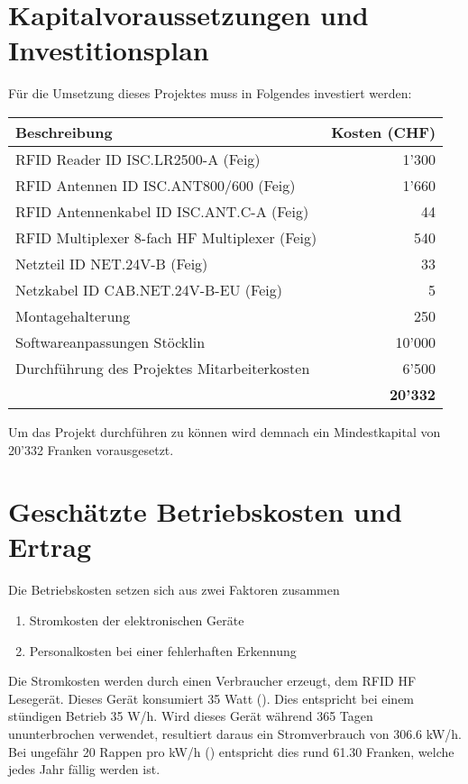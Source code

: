 \chapter{Kapitalvoraussetzungen und Investitionsplan}
Für die Umsetzung dieses Projektes muss in Folgendes investiert werden:

\vspace{1em}

\begin{tabularx}{\textwidth}{|X|r|}
	\hline
	\textbf{Beschreibung} & \textbf{Kosten (CHF)} \\
	\hline
	RFID Reader ID ISC.LR2500-A (Feig) & 1'300 \\
	\hline
	RFID Antennen ID ISC.ANT800/600 (Feig) & 1'660 \\
	\hline
	RFID Antennenkabel ID ISC.ANT.C-A (Feig) & 44 \\
	\hline
	RFID Multiplexer 8-fach HF Multiplexer (Feig) & 540 \\
	\hline
	Netzteil ID NET.24V-B (Feig) & 33 \\
	\hline
	Netzkabel ID CAB.NET.24V-B-EU (Feig) & 5 \\
	\hline
	Montagehalterung & 250 \\
	\hline
	Softwareanpassungen Stöcklin & 10'000 \\
	\hline
	Durchführung des Projektes Mitarbeiterkosten & 6'500 \\
	\hline
	\hline
	 & \textbf{20'332} \\
	 \hline
\end{tabularx}

\vspace{1em}

Um das Projekt durchführen zu können wird demnach ein Mindestkapital von 20'332 Franken vorausgesetzt.

\chapter{Geschätzte Betriebskosten und Ertrag}
Die Betriebskosten setzen sich aus zwei Faktoren zusammen
\begin{enumerate}
	\item Stromkosten der elektronischen Geräte
	\item Personalkosten bei einer fehlerhaften Erkennung
\end{enumerate}

Die Stromkosten werden durch einen Verbraucher erzeugt, dem RFID HF Lesegerät. Dieses Gerät konsumiert 35 Watt (\cite{DatenblattRFIDReader}). Dies entspricht bei einem stündigen Betrieb 35 W/h. Wird dieses Gerät während 365 Tagen ununterbrochen verwendet, resultiert daraus ein Stromverbrauch von 306.6 kW/h. Bei ungefähr 20 Rappen pro kW/h (\cite{StromPreisAdmin2019}) entspricht dies rund 61.30 Franken, welche jedes Jahr fällig werden ist.


